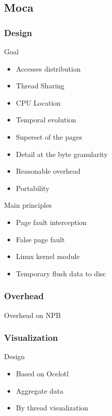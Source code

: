 \documentclass[xcolor={usenames,dvipsnames}]{beamer}
\begin{document}
\subsection{Moca}

\subsubsection{Design}

\begin{frame}{Goal}
    \begin{itemize}[<+->]
        \item Accesses distribution
        \item Thread Sharing
        \item CPU Location
        \item Temporal evolution
        \item Superset of the pages
        \item Detail at the byte granularity
        \item Reasonable overhead
        \item Portability
    \end{itemize}
\end{frame}

\begin{frame}{Main principles}
    \begin{itemize}
        \item Page fault interception
        \item False page fault
        \item Linux kernel module
        \item Temporary flush data to disc
    \end{itemize}
\end{frame}

\subsubsection{Overhead}

\begin{frame}{Overhead on NPB}
\end{frame}

\subsubsection{Visualization}

\begin{frame}{Design}
    \begin{itemize}
        \item Based on Ocelotl\cite{Dosimont14Trace}
        \item Aggregate data
        \item By thread visualization
    \end{itemize}
\end{frame}
\end{document}
